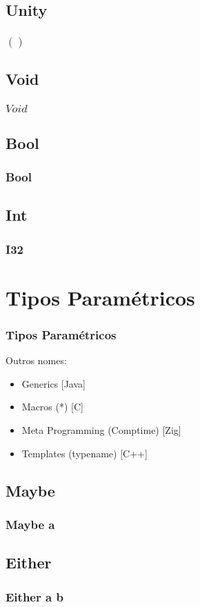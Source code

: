 \documentclass{beamer}
\begin{document}
\subsection{Unity}
\begin{frame}
    \frametitle{\(()\)}
\end{frame}

\subsection{Void}
\begin{frame}
    \frametitle{\(Void\)}
\end{frame}

\subsection{Bool}
\begin{frame}
    \frametitle{Bool}
\end{frame}

\subsection{Int}
\begin{frame}
    \frametitle{I32}
\end{frame}

\section{Tipos Paramétricos}
\begin{frame}
    \frametitle{Tipos Paramétricos}
    Outros nomes:
    \begin{itemize}
        \item Generics [Java]
        \item Macros (*) [C]
        \item Meta Programming (Comptime) [Zig]
        \item Templates (typename) [C++]
    \end{itemize}
\end{frame}

\subsection{Maybe}
\begin{frame}
    \frametitle{Maybe a}
\end{frame}

\subsection{Either}
\begin{frame}
    \frametitle{Either a b}
\end{frame}
\end{document}
